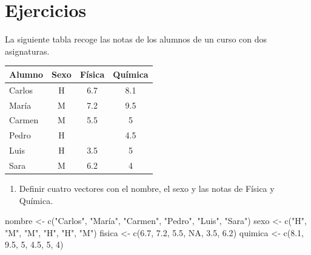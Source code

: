 \documentclass[
  a4paper,
]{scrreport}
\newenvironment{Shaded}{\begin{snugshade}}{\end{snugshade}}
\newcommand{\ConstantTok}[1]{\textcolor[rgb]{0.56,0.35,0.01}{#1}}
\newcommand{\DecValTok}[1]{\textcolor[rgb]{0.68,0.00,0.00}{#1}}
\newcommand{\FloatTok}[1]{\textcolor[rgb]{0.68,0.00,0.00}{#1}}
\newcommand{\FunctionTok}[1]{\textcolor[rgb]{0.28,0.35,0.67}{#1}}
\newcommand{\NormalTok}[1]{\textcolor[rgb]{0.00,0.23,0.31}{#1}}
\newcommand{\OtherTok}[1]{\textcolor[rgb]{0.00,0.23,0.31}{#1}}
\newcommand{\StringTok}[1]{\textcolor[rgb]{0.13,0.47,0.30}{#1}}
\providecommand{\tightlist}{%
  \setlength{\itemsep}{0pt}\setlength{\parskip}{0pt}}\usepackage{longtable,booktabs,array}
\theoremstyle{definition}
\theoremstyle{definition}
\theoremstyle{remark}
\begin{document}
\hypertarget{ejercicios-1}{%
\section{Ejercicios}\label{ejercicios-1}}

La siguiente tabla recoge las notas de los alumnos de un curso con dos
asignaturas.

\begin{longtable}[]{@{}lccc@{}}
\toprule()
Alumno & Sexo & Física & Química \\
\midrule()
\endhead
Carlos & H & 6.7 & 8.1 \\
María & M & 7.2 & 9.5 \\
Carmen & M & 5.5 & 5 \\
Pedro & H & & 4.5 \\
Luis & H & 3.5 & 5 \\
Sara & M & 6.2 & 4 \\
\bottomrule()
\end{longtable}

\begin{enumerate}
\def\labelenumi{\alph{enumi}.}
\tightlist
\item
  Definir cuatro vectores con el nombre, el sexo y las notas de Física y
  Química.
\end{enumerate}

\begin{tcolorbox}[enhanced jigsaw, colback=white, opacityback=0, breakable, colframe=quarto-callout-note-color-frame, coltitle=black, bottomrule=.15mm, opacitybacktitle=0.6, toprule=.15mm, left=2mm, title=\textcolor{quarto-callout-note-color}{\faInfo}\hspace{0.5em}{Solución}, colbacktitle=quarto-callout-note-color!10!white, bottomtitle=1mm, titlerule=0mm, toptitle=1mm, arc=.35mm, rightrule=.15mm, leftrule=.75mm]

\begin{Shaded}
\begin{Highlighting}[]
\NormalTok{nombre }\OtherTok{\textless{}{-}} \FunctionTok{c}\NormalTok{(}\StringTok{"Carlos"}\NormalTok{, }\StringTok{"María"}\NormalTok{, }\StringTok{"Carmen"}\NormalTok{, }\StringTok{"Pedro"}\NormalTok{, }\StringTok{"Luis"}\NormalTok{, }\StringTok{"Sara"}\NormalTok{)}
\NormalTok{sexo }\OtherTok{\textless{}{-}} \FunctionTok{c}\NormalTok{(}\StringTok{"H"}\NormalTok{, }\StringTok{"M"}\NormalTok{, }\StringTok{"M"}\NormalTok{, }\StringTok{"H"}\NormalTok{, }\StringTok{"H"}\NormalTok{, }\StringTok{"M"}\NormalTok{)}
\NormalTok{fisica }\OtherTok{\textless{}{-}} \FunctionTok{c}\NormalTok{(}\FloatTok{6.7}\NormalTok{, }\FloatTok{7.2}\NormalTok{, }\FloatTok{5.5}\NormalTok{, }\ConstantTok{NA}\NormalTok{, }\FloatTok{3.5}\NormalTok{, }\FloatTok{6.2}\NormalTok{)}
\NormalTok{quimica }\OtherTok{\textless{}{-}} \FunctionTok{c}\NormalTok{(}\FloatTok{8.1}\NormalTok{, }\FloatTok{9.5}\NormalTok{, }\DecValTok{5}\NormalTok{, }\FloatTok{4.5}\NormalTok{, }\DecValTok{5}\NormalTok{, }\DecValTok{4}\NormalTok{)}
\end{Highlighting}
\end{Shaded}

\end{tcolorbox}
\end{document}
